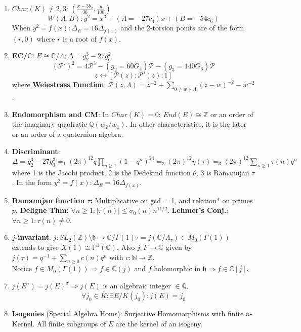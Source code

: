 \documentclass{article}
\newcommand{\Q}{\mathbb{Q}}
\newcommand{\C}{\mathbb{C}}
\newcommand{\Z}{\mathbb{Z}}
\newcommand{\hh}{\mathfrak{h}}
\newcommand{\PP}{\mathbb{P}}
\newcommand{\N}{\mathbb{N}}
\newcommand{\wf}{\mathcal{P}}
\newcommand{\ra}{\rightarrow}
\newcommand{\Ra}{\Rightarrow}
\newcommand{\lra}{\leftrightarrow}
\begin{document}
\begin{multicols}{2}
\begin{enumerate}
\item $Char(K) \neq 2,3$: $(\frac{x-3b_2}{36}, \frac{y}{108})$ 
\[W(A,B): y^2 = x^3 + (A= -27c_4)x + (B = -54c_6)\]
When $y^2 = f(x): \Delta_E = 16\Delta_{f(x)}$ and the 2-torsion points are of the form $(r,0)$ where $r$ is a root of $f(x)$.  

\item \textbf{EC/$\C$}: $E \cong \C/\Lambda; \Delta = g_2^3 - 27g_6^2$
\[(\wf')^2 = 4\wf^3 - (g_2 = 60G_4)\wf - (g_3 = 140G_6)\wf\]
\[z \lra [\wf(z):\wf'(z):1] \]
where \textbf{Weiestrass Function}: $\wf(z, \Lambda) = z^{-2} + \sum_{0 \neq w \in \Lambda} (z-w)^{-2} - w^{-2}$.

\item \textbf{Endomorphism and CM}: In $Char(K) = 0$: $End(E) \cong \Z$ or an order of the imaginary quadratic $\Q(w_2/w_1)$. In other characteristics, it is the later or an order of a quaternion algebra.

\item \textbf{Discriminant}: $\Delta = g_2^3 - 27g_3^3 =_1 (2\pi)^{12} q\prod_{n \geq 1}(1-q^n)^{24} =_2 (2\pi)^{12} \eta(\tau) =_3 (2\pi)^{12} \sum_{n \geq 1} \tau(n) q^n$ where 1 is the Jacobi product, 2 is the Dedekind function $\theta$, 3 is Ramanujan $\tau$. In the form $y^2 = f(x): \Delta_E = 16\Delta_{f(x)}$. 

\item \textbf{Ramanujan function $\tau$:} Multiplicative on gcd = 1, and relation* on primes $p$. \textbf{Deligne Thm:} $\forall n \geq 1: |\tau(n)| \leq \sigma_0(n) n^{11/2}$. \textbf{Lehmer's Conj.}: $\forall n \geq 1: \tau(n) \neq 0$.

\item \textbf{$j$-invariant}: $j: SL_2(\Z)\setminus \hh \ra \C/ \Gamma(1)\tau = j(\C/\Lambda_\tau) \in M_0(\Gamma(1))$ extends to give $X(1) \cong \PP^1(\C)$. Also $j: F \ra \C$ given by $j(\tau) = q^{-1} + \sum_{n \geq 0} c(n)q^n$ with $c:\N \ra \Z$.\\
Notice $f \in M_0(\Gamma(1)) \Ra f \in \C(j)$ and $f$ holomorphic in $\hh \Ra f \in \C[j]$. 

\item $j(E^\sigma) = j(E)^\sigma \Ra j(E)$ is an algebraic integer $\in \overline{\Q}$. \\ 
\[\forall j_0 \in \overline{K}: \exists E/K(j_0): j(E) = j_0\]

\item \textbf{Isogenies} (Special Algebra Homs): Surjective Homomorphisms with finite $n$-Kernel. All finite subgroups of $E$ are the kernel of an isogeny. 


\end{enumerate}
\end{multicols}
\end{document}
